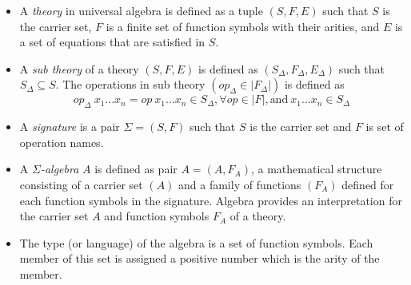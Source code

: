 \begin{itemize}
    \item A \textit{theory} in universal algebra is defined as a tuple $(S,F,E)$
    such that $S$ is the carrier set, $F$ is a finite set of function symbols
    with their arities, and $E$ is a set of equations that are satisfied in $S$.

    \item A \emph{sub theory} of a theory $(S,F,E)$ is defined as
    $(S_\Delta,F_\Delta,E_\Delta)$ such that $S_\Delta \subseteq S$. The operations
    in sub theory $(op_\Delta \in |F_\Delta|)$ is defined as
    \[op_\Delta\ x_1...x_n = op\ x_1...x_n \in S_\Delta,\forall op \in
    |F|,\text{and}\ x_1...x_n \in S_\Delta \]  

    \item A \textit{signature} is a pair $\Sigma = (S,F)$ such that $S$ is the
    carrier set and $F$ is set of operation names.

    \item A \emph{$\Sigma$-algebra} $A$ is defined as pair $A = (A,F_A)$, a
    mathematical structure consisting of a carrier set $(A)$ and a family of
    functions $(F_A)$ defined for each function symbols in the signature.
    Algebra provides an interpretation for the carrier set $A$ and function
    symbols $F_A$ of a theory.

    \item The type (or language) of the algebra is a set of function symbols.
    Each member of this set is assigned a positive number which is the arity of
    the member.
\end{itemize}

